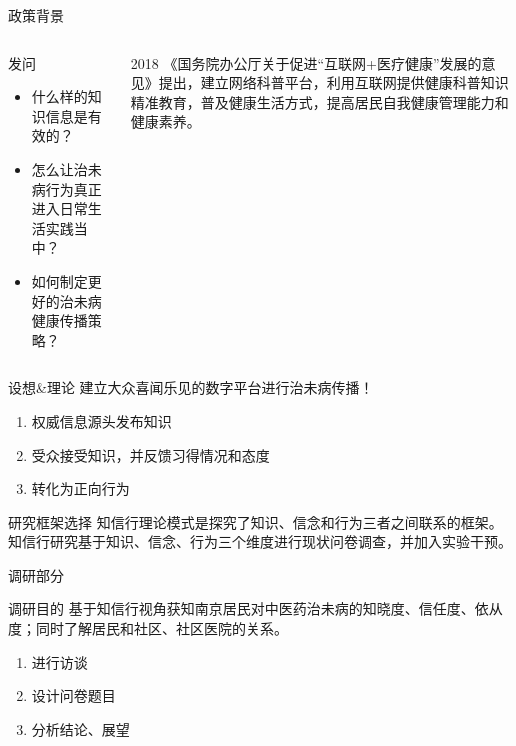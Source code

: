 \begin{frame}{政策背景}
\begin{columns}
    \begin{column}{0.5\textwidth}
       \begin{block}{发问}
       
           \vfill
           \begin{itemize}
               \item 什么样的知识信息是有效的？
               \item 怎么让治未病行为真正进入日常生活实践当中？
               \item 如何制定更好的治未病健康传播策略？
           \end{itemize}
       \end{block}
    \end{column}
    \begin{column}{0.5\textwidth}
\begin{block}{2018}
    《国务院办公厅关于促进“互联网+医疗健康”发展的意见》提出，建立网络科普平台，利用互联网提供健康科普知识精准教育，普及健康生活方式，提高居民自我健康管理能力和健康素养。
\end{block}
\end{column}
\end{columns}
\end{frame}

\begin{frame}{设想\&理论}
%
\large 建立大众喜闻乐见的数字平台进行治未病传播！
\vfill
\normalsize
 \begin{enumerate}
    \item 权威信息源头发布知识
    \item 受众接受知识，并反馈习得情况和态度
    \item 转化为正向行为
\end{enumerate}

\begin{block}{研究框架选择}
知信行理论模式是探究了知识、信念和行为三者之间联系的框架。知信行研究基于知识、信念、行为三个维度进行现状问卷调查，并加入实验干预。
\end{block}
\end{frame}
\begin{frame}{调研部分}
\begin{block}{调研目的}
基于知信行视角获知南京居民对中医药治未病的知晓度、信任度、依从度；同时了解居民和社区、社区医院的关系。
\end{block}
\begin{enumerate}
    \item 进行访谈
    \item 设计问卷题目
    \item 分析结论、展望
\end{enumerate}
\end{frame}
